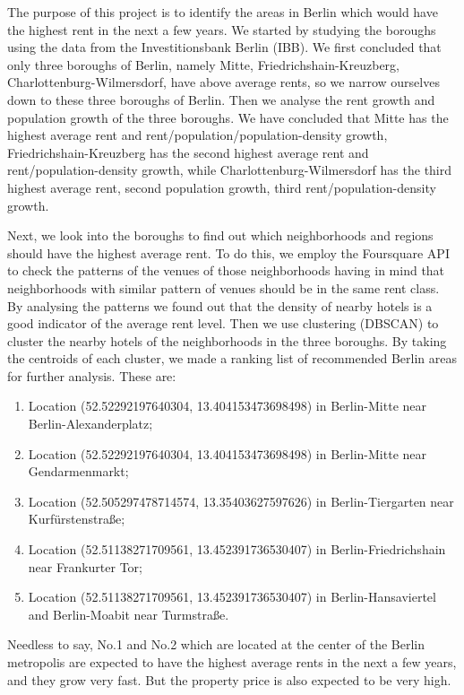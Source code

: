 \documentclass[11pt]{article}
\providecommand{\tightlist}{%
      \setlength{\itemsep}{0pt}\setlength{\parskip}{0pt}}
\begin{document}
    The purpose of this project is to identify the areas in Berlin which
would have the highest rent in the next a few years. We started by
studying the boroughs using the data from the Investitionsbank Berlin
(IBB). We first concluded that only three boroughs of Berlin, namely
Mitte, Friedrichshain-Kreuzberg, Charlottenburg-Wilmersdorf, have above
average rents, so we narrow ourselves down to these three boroughs of
Berlin. Then we analyse the rent growth and population growth of the
three boroughs. We have concluded that Mitte has the highest average
rent and rent/population/population-density growth,
Friedrichshain-Kreuzberg has the second highest average rent and
rent/population-density growth, while Charlottenburg-Wilmersdorf has the
third highest average rent, second population growth, third
rent/population-density growth.

    Next, we look into the boroughs to find out which neighborhoods and
regions should have the highest average rent. To do this, we employ the
Foursquare API to check the patterns of the venues of those
neighborhoods having in mind that neighborhoods with similar pattern of
venues should be in the same rent class. By analysing the patterns we
found out that the density of nearby hotels is a good indicator of the
average rent level. Then we use clustering (DBSCAN) to cluster the
nearby hotels of the neighborhoods in the three boroughs. By taking the
centroids of each cluster, we made a ranking list of recommended Berlin
areas for further analysis. These are:

\begin{enumerate}
\def\labelenumi{\arabic{enumi}.}
\tightlist
\item
  Location (52.52292197640304, 13.404153473698498) in Berlin-Mitte near
  Berlin-Alexanderplatz;
\item
  Location (52.52292197640304, 13.404153473698498) in Berlin-Mitte near
  Gendarmenmarkt;
\item
  Location (52.505297478714574, 13.35403627597626) in Berlin-Tiergarten
  near Kurfürstenstraße;
\item
  Location (52.51138271709561, 13.452391736530407) in
  Berlin-Friedrichshain near Frankurter Tor;
\item
  Location (52.51138271709561, 13.452391736530407) in
  Berlin-Hansaviertel and Berlin-Moabit near Turmstraße.
\end{enumerate}

    Needless to say, No.1 and No.2 which are located at the center of the
Berlin metropolis are expected to have the highest average rents in the
next a few years, and they grow very fast. But the property price is
also expected to be very high.
\end{document}
